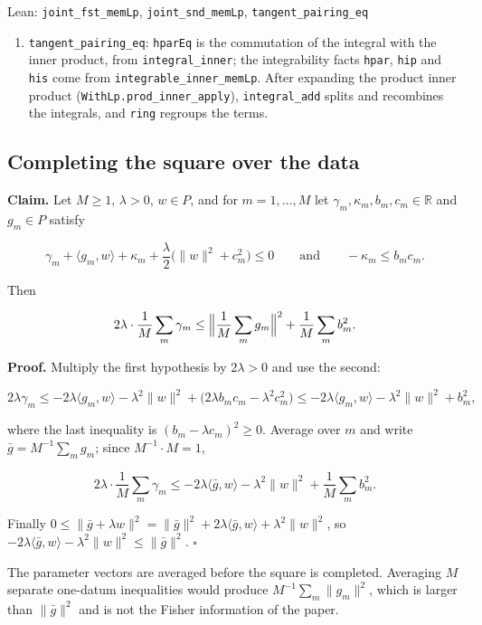 \documentclass[11pt,a4paper]{report}
\begin{document}
\begin{leanbox}{Lean: \texttt{joint\_\allowbreak{}fst\_\allowbreak{}memLp}, \texttt{joint\_\allowbreak{}snd\_\allowbreak{}memLp}, \texttt{tangent\_\allowbreak{}pairing\_\allowbreak{}eq}}
\begin{enumerate}
\item \texttt{tangent\_\allowbreak{}pairing\_\allowbreak{}eq}: \texttt{hpar\allowbreak{}Eq} is the commutation of the integral with the inner product, from \texttt{integral\_\allowbreak{}inner}; the integrability facts \texttt{hpar}, \texttt{hip} and \texttt{his} come from \texttt{integrable\_\allowbreak{}inner\_\allowbreak{}mem\allowbreak{}Lp}. After expanding the product inner product (\texttt{With\allowbreak{}Lp.\allowbreak{}prod\_\allowbreak{}inner\_\allowbreak{}apply}), \texttt{integral\_\allowbreak{}add} splits and recombines the integrals, and \texttt{ring} regroups the terms.

\end{enumerate}
\end{leanbox}
\subsection{\texorpdfstring{Completing the square over the data}{Completing the square over the data}}


\textbf{Claim.} Let \(M\ge1\), \(\lambda>0\), \(w\in P\), and for \(m=1,\dots,M\) let \(\gamma_m,\kappa_m,b_m,c_m\in\mathbb R\) and \(g_m\in P\) satisfy


\[\gamma_m+\langle g_m,w\rangle+\kappa_m+\frac\lambda2\bigl(\|w\|^2+c_m^2\bigr)\le0\qquad\text{and}\qquad-\kappa_m\le b_mc_m.\]


Then


\[2\lambda\cdot\frac1M\sum_m\gamma_m\le\Bigl\|\frac1M\sum_mg_m\Bigr\|^2+\frac1M\sum_mb_m^2.\]


\textbf{Proof.} Multiply the first hypothesis by \(2\lambda>0\) and use the second:


\[2\lambda\gamma_m\le-2\lambda\langle g_m,w\rangle-\lambda^2\|w\|^2+\bigl(2\lambda b_mc_m-\lambda^2c_m^2\bigr)\le-2\lambda\langle g_m,w\rangle-\lambda^2\|w\|^2+b_m^2,\]


where the last inequality is \((b_m-\lambda c_m)^2\ge0\). Average over \(m\) and write \(\bar g=M^{-1}\sum_mg_m\); since \(M^{-1}\cdot M=1\),


\[2\lambda\cdot\frac1M\sum_m\gamma_m\le-2\lambda\langle\bar g,w\rangle-\lambda^2\|w\|^2+\frac1M\sum_mb_m^2.\]


Finally \(0\le\|\bar g+\lambda w\|^2=\|\bar g\|^2+2\lambda\langle\bar g,w\rangle+\lambda^2\|w\|^2\), so \(-2\lambda\langle\bar g,w\rangle-\lambda^2\|w\|^2\le\|\bar g\|^2\). \(\square\)




The parameter vectors are averaged before the square is completed. Averaging \(M\) separate one-datum inequalities would produce \(M^{-1}\sum_m\|g_m\|^2\), which is larger than \(\|\bar g\|^2\) and is not the Fisher information of the paper.
\end{document}

